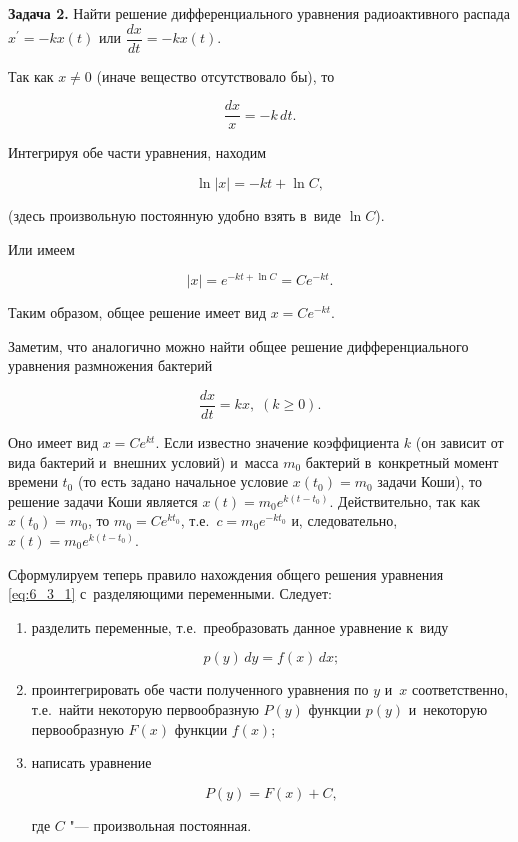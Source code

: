 \textbf{Задача 2.}\label{ex:6_3_2} Найти решение дифференциального уравнения
радиоактивного распада $x^\prime = -kx(t)$ или $\dfrac{dx}{dt} = -kx(t)$.

Так как $x \ne 0$ (иначе вещество отсутствовало бы), то

\begin{equation*}
\dfrac{dx}{x} = -k \, dt.
\end{equation*}

\noindent
Интегрируя обе части уравнения, находим

\begin{equation*}
\ln |x| = -kt + \ln C,
\end{equation*}

\noindent
(здесь произвольную постоянную удобно взять в~виде $\ln C$).

Или имеем 

\begin{equation*}
|x| = e^{-kt + \ln C} = Ce^{-kt}.
\end{equation*}

Таким образом, общее решение имеет вид $x = Ce^{-kt}$.

Заметим, что аналогично можно найти общее решение дифференциального уравнения
размножения бактерий

\begin{equation*}
\dfrac{dx}{dt} = kx, \; (k \geqslant 0).
\end{equation*}

Оно имеет вид $x = Ce^{kt}$. Если известно значение коэффициента $k$
(он зависит от вида бактерий и~внешних условий) и~масса $m_{0}$ бактерий
в~конкретный момент времени $t_{0}$ (то есть задано начальное условие
$x(t_{0}) = m_{0}$ задачи Коши), то решение задачи Коши
является $x(t) = m_{0}e^{k(t - t_{0})}$.
Действительно, так как $x(t_{0}) = m_{0}$, то $m_{0} = Ce^{kt_{0}}$,
т.е.\ $c = m_{0}e^{-kt_{0}}$ и, следовательно, $x(t) = m_{0}e^{k(t-t_{0})}$.

Сформулируем теперь правило нахождения общего решения уравнения \eqref{eq:6_3_1}
с~разделяющими переменными. Следует:

\begin{enumerate}
\item разделить переменные, т.е.\ преобразовать данное уравнение к~виду

\begin{equation}\label{eq:6_3_6}
p(y)\, dy = f(x) \, dx;
\end{equation}

\item проинтегрировать обе части полученного уравнения по $y$ и~$x$ соответственно,
т.е.\ найти некоторую первообразную $P(y)$ функции $p(y)$ и~некоторую первообразную
$F(x)$ функции $f(x)$;

\item написать уравнение

\begin{equation}\label{eq:6_3_7}
P(y) = F(x) + C,
\end{equation}

\noindent
где $C$ "--- произвольная постоянная.

\end{enumerate}

